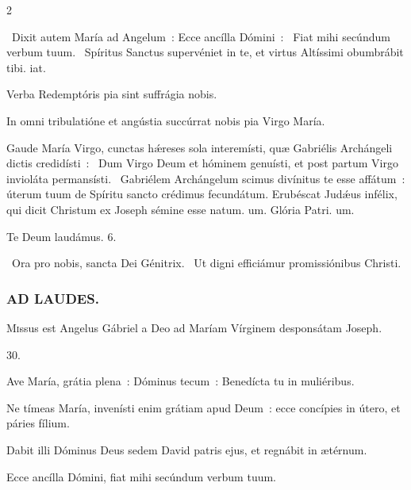 \documentclass[9pt,twoside]{extarticle}
\begin{document}
\begin{multicols}{2}
\begin{tightlist}{}
\item {}~Dixit autem María ad Angelum~: Ecce ancílla Dómini~: \textred{*}~Fiat mihi secúndum verbum tuum. ~Spíritus Sanctus supervéniet in te, et virtus Altíssimi obumbrábit tibi. iat.
\item {} Verba Redemptóris pia sint suffrágia nobis.
\item {} In omni tribulatióne et angústia succúrrat nobis pia Virgo María.
\item {} Gaude María Virgo, cunctas hǽreses sola interemísti, quæ Gabriélis Archángeli dictis credidísti~: \textred{*}~Dum Virgo Deum et hóminem genuísti, et post partum Virgo invioláta permansísti. ~Gabriélem Archángelum scimus divínitus te esse affátum~: úterum tuum de Spíritu sancto crédimus fecundátum. Erubéscat Judǽus infélix, qui dicit Christum ex Joseph sémine esse natum. um. Glória Patri. um.
\item Te Deum laudámus. 6.
\item {}~Ora pro nobis, sancta Dei Génitrix. ~Ut digni efficiámur promissiónibus Christi.
\end{tightlist}

\subsubsection*{\center \textsc{AD LAUDES.}}
\begin{center}\end{center}
\lettrine{M}issus est Angelus Gábriel a Deo ad Maríam Vírginem desponsátam Joseph.

\begin{tightlist}{}
\item {} 30.
\item {} Ave María, grátia plena~: Dóminus tecum~: Benedícta tu in muliéribus.
\item {} Ne tímeas María, invenísti enim grátiam apud Deum~: ecce concípies in útero, et páries fílium.
\item {} Dabit illi Dóminus Deus sedem David patris ejus, et regnábit in ætérnum.
\item {} Ecce ancílla Dómini, fiat mihi secúndum verbum tuum.
\end{tightlist}


\end{multicols}
\end{document}
